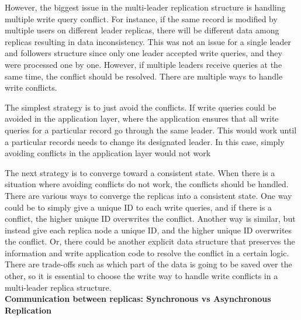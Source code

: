 However, the biggest issue in the multi-leader replication structure is handling multiple write query conflict.
For instance, if the same record is modified by multiple users on different leader replicas, 
there will be different data among replicas resulting in data inconsistency.
This was not an issue for a single leader and followers structure since only one leader accepted write queries, and they were processed one by one. However, if multiple leaders receive queries at the same time, the conflict should be resolved. There are multiple ways to handle write conflicts.

The simplest strategy is to just avoid the conflicts. If write queries could be avoided in the application layer,
where the application ensures that all write queries for a particular record go through the same leader.
This would work until a particular records needs to change its designated leader. In this case, simply avoiding conflicts in the application layer would not work

The next strategy is to converge toward a consistent state. When there is a situation where avoiding conflicts do not work, 
the conflicts should be handled. There are various ways to converge the replicas into a consistent state.
One way could be to simply give a unique ID to each write queries, and if there is a conflict, 
the higher unique ID overwrites the conflict.
Another way is similar, but instead give each replica node a unique ID, and the higher unique ID overwrites the conflict.
Or, there could be another explicit data structure that preserves the information and write application code to resolve 
the conflict in a certain logic. There are trade-offs such as which part of the data is going to be saved over the other, 
so it is essential to choose the write way to handle write conflicts in a multi-leader replica structure. \\


\noindent \textbf{Communication between replicas: Synchronous vs Asynchronous Replication}

